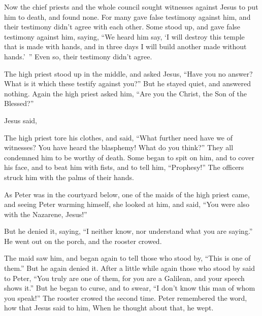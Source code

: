 {Now the chief priests and the whole council sought witnesses against Jesus to put him to death, and found none.
For many gave false testimony against him, and their testimony didn’t agree with each other.
Some stood up, and gave false testimony against him, saying,
“We heard him say, ‘I will destroy this temple that is made with hands, and in three days I will build another made without hands.’ ”
Even so, their testimony didn’t agree.
\par }{\PP {}The high priest stood up in the middle, and asked Jesus, “Have you no answer? What is it which these testify against you?”
But he stayed quiet, and answered nothing. Again the high priest asked him, “Are you the Christ, the Son of the Blessed?”
\par }{\PP {}Jesus said,
{}
\par }{\PP {}The high priest tore his clothes, and said, “What further need have we of witnesses?
You have heard the blasphemy! What do you think?” They all condemned him to be worthy of death.
Some began to spit on him, and to cover his face, and to beat him with fists, and to tell him, “Prophesy!” The officers struck him with the palms of their hands.
\par }{\PP {}As Peter was in the courtyard below, one of the maids of the high priest came,
and seeing Peter warming himself, she looked at him, and said, “You were also with the Nazarene, Jesus!”
\par }{\PP {}But he denied it, saying, “I neither know, nor understand what you are saying.” He went out on the porch, and the rooster crowed.
\par }{\PP {}The maid saw him, and began again to tell those who stood by, “This is one of them.”
But he again denied it. After a little while again those who stood by said to Peter, “You truly are one of them, for you are a Galilean, and your speech shows it.”
But he began to curse, and to swear, “I don’t know this man of whom you speak!”
The rooster crowed the second time. Peter remembered the word, how that Jesus said to him,
{} When he thought about that, he wept.

}
